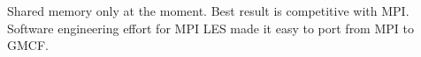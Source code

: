 Shared memory only at the moment. Best result is competitive with MPI. Software
engineering effort for MPI LES made it easy to port from MPI to GMCF.
